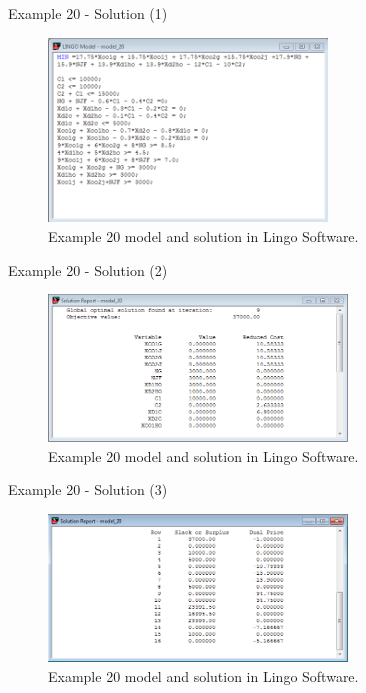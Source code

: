 \begin{frame}{Example 20 - Solution (1)}
\begin{figure}
    \includegraphics[width=280px]{slides/ex20/screenshot_a.png}
    \caption{Example 20 model and solution in Lingo Software.}
\end{figure}
\end{frame}

\begin{frame}{Example 20 - Solution (2)}
\begin{figure}
    \includegraphics[width=300px]{slides/ex20/screenshot_b.png}
    \caption{Example 20 model and solution in Lingo Software.}
\end{figure}
\end{frame}

\begin{frame}{Example 20 - Solution (3)}
\begin{figure}
    \includegraphics[width=300px]{slides/ex20/screenshot_c.png}
    \caption{Example 20 model and solution in Lingo Software.}
\end{figure}
\end{frame}
